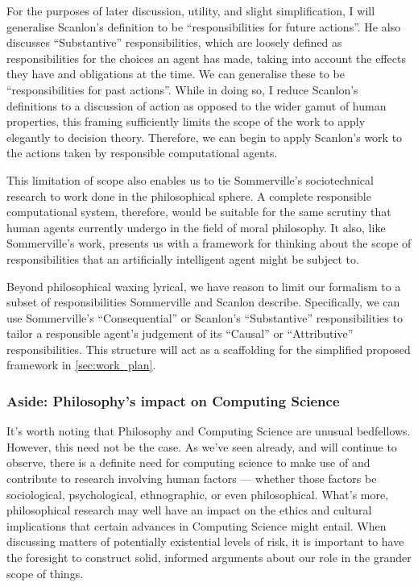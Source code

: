 For the purposes of later discussion, utility, and slight simplification, I will generalise Scanlon's definition to be ``responsibilities for future actions''. He also discusses ``Substantive'' responsibilities, which are loosely defined as responsibilities for the choices an agent has made, taking into account the effects they have and obligations at the time. We can generalise these to be ``responsibilities for past actions''. While in doing so, I reduce Scanlon's definitions to a discussion of action as opposed to the wider gamut of human properties, this framing sufficiently limits the scope of the work to apply elegantly to decision theory. Therefore, we can begin to apply Scanlon's work to the actions taken by responsible computational agents.\par

This limitation of scope also enables us to tie Sommerville's sociotechnical research to work done in the philosophical sphere. A complete responsible computational system, therefore, would be suitable for the same scrutiny that human agents currently undergo in the field of moral philosophy. It also, like Sommerville's work, presents us with a framework for thinking about the scope of responsibilities that an artificially intelligent agent might be subject to.\par

Beyond philosophical waxing lyrical, we have reason to limit our formalism to a subset of responsibilities Sommerville and Scanlon describe. Specifically, we can use Sommerville's ``Consequential'' or Scanlon's ``Substantive'' responsibilities to tailor a responsible agent's judgement of its ``Causal'' or ``Attributive'' responsibilities. This structure will act as a scaffolding for the simplified proposed framework in \cref{sec:work_plan}.

\subsubsection{Aside: Philosophy's impact on Computing Science}
It's worth noting that Philosophy and Computing Science are unusual bedfellows. However, this need not be the case. As we've seen already, and will continue to observe, there is a definite need for computing science to make use of and contribute to research involving human factors --- whether those factors be sociological, psychological, ethnographic, or even philosophical. What's more, philosophical research may well have an impact on the ethics and cultural implications that certain advances in Computing Science might entail. When discussing matters of potentially existential levels of risk, it is important to have the foresight to construct solid, informed arguments about our role in the grander scope of things.\par

